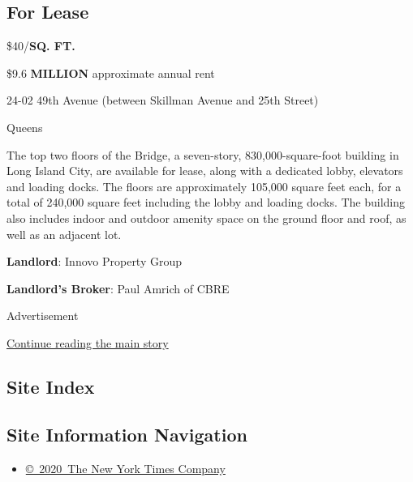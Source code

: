 \hypertarget{for-lease}{%
\subsection{For Lease}\label{for-lease}}

\$40/\textbf{SQ. FT.}

\$9.6 \textbf{MILLION} approximate annual rent

24-02 49th Avenue (between Skillman Avenue and 25th Street)

Queens

The top two floors of the Bridge, a seven-story, 830,000-square-foot
building in Long Island City, are available for lease, along with a
dedicated lobby, elevators and loading docks. The floors are
approximately 105,000 square feet each, for a total of 240,000 square
feet including the lobby and loading docks. The building also includes
indoor and outdoor amenity space on the ground floor and roof, as well
as an adjacent lot.

\textbf{Landlord}: Innovo Property Group

\textbf{Landlord's Broker}: Paul Amrich of CBRE

Advertisement

\protect\hyperlink{after-bottom}{Continue reading the main story}

\hypertarget{site-index}{%
\subsection{Site Index}\label{site-index}}

\hypertarget{site-information-navigation}{%
\subsection{Site Information
Navigation}\label{site-information-navigation}}

\begin{itemize}
\tightlist
\item
  \href{https://help.nytimes.com/hc/en-us/articles/115014792127-Copyright-notice}{©~2020~The
  New York Times Company}
\end{itemize}

